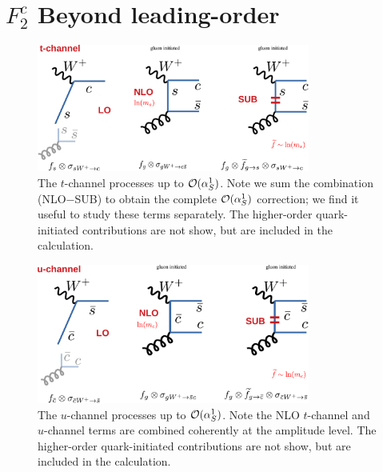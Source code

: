 \null\vfill\eject  %
\newcommand{\xsec}[1]{\vskip 6pt \noindent {\bf #1} \quad }
\appendix
{}

\section{$F_{2}^{c}$ Beyond leading-order}\label{sec:appendix}

\begin{figure}
  \centering \includegraphics[clip,width=0.8\textwidth]{pics/fred/tchannel}
  \caption{The $t$-channel processes up to ${\cal  O}(\alpha_S^1)$.
Note we sum the combination (NLO$-$SUB) to obtain the complete ${\cal  O}(\alpha_S^1)$ correction;
we find it useful to study these terms separately.
The higher-order quark-initiated contributions are not show, but are included in the calculation. 
\label{fig:tchannel}}
\end{figure}

\begin{figure}
  \centering \includegraphics[clip,width=0.8\textwidth]{pics/fred/uchannel}
\caption{The $u$-channel processes  up to ${\cal  O}(\alpha_S^1)$.
Note the NLO  $t$-channel and $u$-channel terms are combined coherently at the amplitude  level. 
The higher-order quark-initiated contributions are not show, but are included in the calculation. 
\label{fig:uchannel}}
\end{figure}


